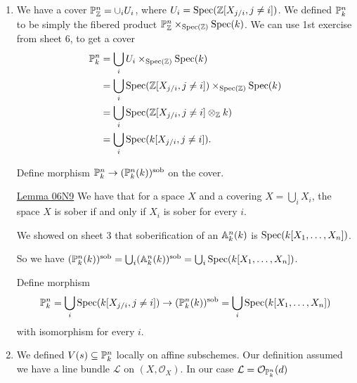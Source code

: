 \begin{exercise}{3}
    \begin{enumerate}
        \item{
            We have a cover $\mathbb{P}^n_{\mathbb{Z}} = \cup_i U_i$, where $U_i = \operatorname{Spec}(\mathbb{Z}[X_{j/i}, j
            \not= i])$. We defined $\mathbb{P}^n_k$ to be simply the fibered product
            $\mathbb{P}^n_{\mathbb{Z}} \times_{\operatorname{Spec}(\mathbb{Z})} \operatorname{Spec}(k)$. We can use 1st exercise from sheet
            6, to get a cover
            \begin{align*}
                \mathbb{P}^n_k &= \bigcup_i U_i \times_{\operatorname{Spec}(\mathbb{Z})} \operatorname{Spec}(k) \\
                &= \bigcup_i \operatorname{Spec}(\mathbb{Z}[X_{j/i}, j \not= i]) \times_{\operatorname{Spec}(\mathbb{Z})} \operatorname{Spec}(k) \\
                &= \bigcup_i \operatorname{Spec}(\mathbb{Z}[X_{j/i}, j \not= i] \otimes_{\mathbb{Z}} k) \\
                &= \bigcup_i \operatorname{Spec}(k[X_{j/i}, j \not= i]).
            \end{align*}

            Define morphism $\mathbb{P}^n_k \to (\mathbb{P}^n_k(k))^{\text{sob}}$ on the
            cover.


            \href{https://stacks.math.columbia.edu/tag/06N9}{Lemma 06N9}
            We have that for a space $X$ and a covering $X = \bigcup_i X_i$, the
            space $X$ is sober if and only if $X_i$ is sober for every $i$.

            We showed on sheet 3 that soberification of an $\mathbb{A}^n_k(k)$ is
            $\operatorname{Spec}(k[X_1, \dots, X_n])$.
            
            So we have $(\mathbb{P}^n_k(k))^{\text{sob}} = \bigcup_i
            (\mathbb{A}^n_k(k))^{\text{sob}} = \bigcup_i \operatorname{Spec}(k[X_1, \dots, X_n])$.

            Define morphism
            \begin{equation*}
                \mathbb{P}^n_k = \bigcup_i \operatorname{Spec}(k[X_{j/i}, j \not= i]) \to
                (\mathbb{P}^n_k(k))^{\text{sob}} = \bigcup_i \operatorname{Spec}(k[X_1, \dots, X_n])
            \end{equation*}
            with isomorphism for every $i$.
            }

        \item{
                We defined $V(s) \subseteq \mathbb{P}^n_k$ locally on affine
                subschemes. Our definition assumed we have a line bundle
                $\mathcal{L}$ on $(X, \mathcal{O}_X)$. In our case $\mathcal{L}
                = \mathcal{O}_{\mathbb{P}^n_k}(d)$

}
\end{enumerate}
\end{exercise}
